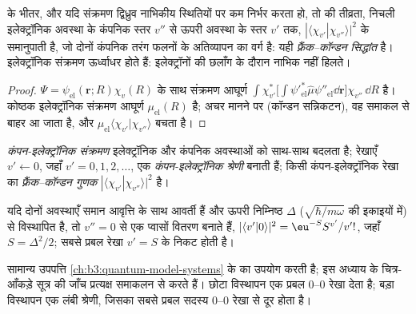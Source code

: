 \begin{theorem}[फ़्रैंक--कॉन्डन सिद्धांत]\label{thm:b3:electronic-spectroscopy:franck-condon}
 के भीतर, और यदि संक्रमण द्विध्रुव
नाभिकीय स्थितियों पर कम निर्भर करता हो, तो  की तीव्रता, निचली इलेक्ट्रॉनिक अवस्था के कंपनिक स्तर $v''$ से ऊपरी अवस्था के स्तर
$v'$ तक, $|\langle\chi_{v'}|\chi_{v''}\rangle|^2$ के समानुपाती है, जो
दोनों कंपनिक तरंग फलनों के अतिव्यापन का वर्ग है: यही
\emph{फ़्रैंक--कॉन्डन सिद्धांत} है। इलेक्ट्रॉनिक
संक्रमण ऊर्ध्वाधर होते हैं: इलेक्ट्रॉनों की छलाँग के दौरान नाभिक नहीं हिलते।
\end{theorem}

\begin{proof}
$\Psi = \psi_{\mathrm{el}}(\mathbf r;R)\chi_v(R)$ के साथ संक्रमण आघूर्ण
$\int\chi_{v'}^*\big[\int\psi'^*_{\mathrm{el}}\hat\mu\psi''_{\mathrm{el}}\dd\mathbf r\big]
\chi_{v''}\,\dd R$ है। कोष्ठक इलेक्ट्रॉनिक संक्रमण आघूर्ण
$\mu_{\mathrm{el}}(R)$ है; अचर मानने पर (कॉन्डन सन्निकटन), वह
समाकल से बाहर आ जाता है, और $\mu_{\mathrm{el}}\langle\chi_{v'}|\chi_{v''}\rangle$ बचता है।
\end{proof}

\begin{definition}[कंपन-इलेक्ट्रॉनिक संक्रमण, श्रेणी, फ़्रैंक--कॉन्डन गुणक]\label{def:b3:electronic-spectroscopy:vibronic}
\emph{कंपन-इलेक्ट्रॉनिक संक्रमण} इलेक्ट्रॉनिक
और कंपनिक अवस्थाओं को साथ-साथ बदलता है; रेखाएँ $v' \leftarrow 0$, जहाँ $v' = 0, 1, 2,
\dots$, एक \emph{कंपन-इलेक्ट्रॉनिक श्रेणी} बनाती हैं; किसी
कंपन-इलेक्ट्रॉनिक रेखा का \emph{फ़्रैंक--कॉन्डन गुणक}
$|\langle\chi_{v'}|\chi_{v''}\rangle|^2$ है।
\end{definition}

\begin{proposition}[विस्थापित दोलित्र]\label{prop:b3:electronic-spectroscopy:displaced}
यदि दोनों अवस्थाएँ समान आवृत्ति के साथ आवर्ती हैं और ऊपरी निम्निष्ठ
$\Delta$ ($\sqrt{\hbar/m\omega}$ की इकाइयों में) से विस्थापित है, तो $v'' = 0$ से  एक प्वासों वितरण बनाते हैं,
$|\langle v'|0\rangle|^2 = \eu^{-S}S^{v'}/v'!$, जहाँ $S = \Delta^2/2$; सबसे प्रबल रेखा
$v' = S$ के निकट होती है।
\end{proposition}
\admitted

सामान्य उपपत्ति \cref{ch:b3:quantum-model-systems} के  का उपयोग
करती है; इस अध्याय के चित्र-आँकड़े सूत्र की जाँच प्रत्यक्ष समाकलन से करते हैं।
छोटा विस्थापन एक प्रबल 0--0 रेखा देता है; बड़ा विस्थापन एक लंबी श्रेणी, जिसका
सबसे प्रबल सदस्य 0--0 रेखा से दूर होता है।

